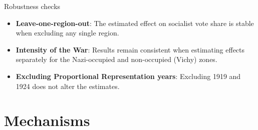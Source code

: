 \documentclass[10pt]{beamer}
\begin{document}
\begin{frame}[label=Robustness]{Robustness checks}

\begin{itemize}

\item \textbf{Leave-one-region-out}:  
The estimated effect on socialist vote share is stable when excluding any single region.  
\hyperlink{robustness1}{}

\bigskip

\item \textbf{Intensity of the War}:   
Results remain consistent when estimating effects separately for the Nazi-occupied and non-occupied (Vichy) zones.  
\hyperlink{robustness2}{}

\bigskip

\item \textbf{Excluding Proportional Representation years}:  
Excluding 1919 and 1924 does not alter the estimates.  
\hyperlink{robustness3}{}

\end{itemize}




\end{frame}




\section{Mechanisms}
\end{document}
